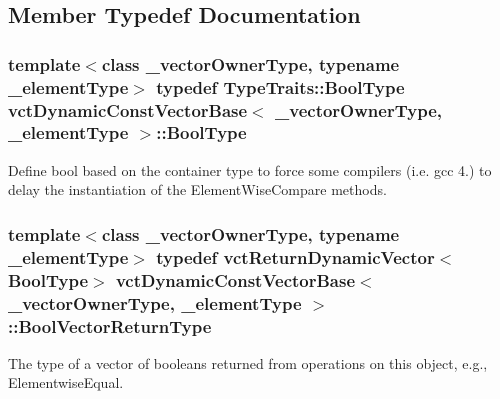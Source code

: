 \subsection{Member Typedef Documentation}
\hypertarget{classvct_dynamic_const_vector_base_a4b96efa633976c8be7648bb4ec0392a7}{}
\subsubsection[{Bool\+Type}]{\setlength{\rightskip}{0pt plus 5cm}template$<$class \+\_\+vector\+Owner\+Type, typename \+\_\+element\+Type$>$ typedef {\bf Type\+Traits\+::\+Bool\+Type} {\bf vct\+Dynamic\+Const\+Vector\+Base}$<$ \+\_\+vector\+Owner\+Type, \+\_\+element\+Type $>$\+::{\bf Bool\+Type}}\label{classvct_dynamic_const_vector_base_a4b96efa633976c8be7648bb4ec0392a7}
Define bool based on the container type to force some compilers (i.\+e. gcc 4.) to delay the instantiation of the Element\+Wise\+Compare methods. \hypertarget{classvct_dynamic_const_vector_base_a2de5b9c0f8c70782c548808d3ae4a453}{}
\subsubsection[{Bool\+Vector\+Return\+Type}]{\setlength{\rightskip}{0pt plus 5cm}template$<$class \+\_\+vector\+Owner\+Type, typename \+\_\+element\+Type$>$ typedef {\bf vct\+Return\+Dynamic\+Vector}$<${\bf Bool\+Type}$>$ {\bf vct\+Dynamic\+Const\+Vector\+Base}$<$ \+\_\+vector\+Owner\+Type, \+\_\+element\+Type $>$\+::{\bf Bool\+Vector\+Return\+Type}}\label{classvct_dynamic_const_vector_base_a2de5b9c0f8c70782c548808d3ae4a453}
The type of a vector of booleans returned from operations on this object, e.\+g., Elementwise\+Equal. \hypertarget{classvct_dynamic_const_vector_base_ad04d1e54698ac5e244d15dfacd0e603c}{}
